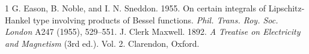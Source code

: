 \documentclass[acmsmall]{acmart}
\begin{document}
\begin{thebibliography}{1}
 G. Eason, B. Noble, and I. N. Sneddon. 1955. On certain integrals of Lipschitz-Hankel type involving products of Bessel functions. \textit{Phil. Trans. Roy. Soc. London} A247 (1955), 529--551.
 J. Clerk Maxwell. 1892. \textit{A Treatise on Electricity and Magnetism} (3rd ed.). Vol. 2. Clarendon, Oxford.
\end{thebibliography}
\end{document}
